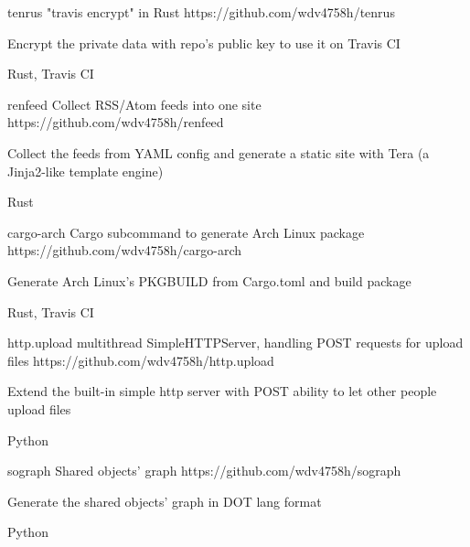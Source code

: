 \begin{cvopensources}
  \cvopensource
    {tenrus}   %
    {"travis encrypt" in Rust}  %
    {https://github.com/wdv4758h/tenrus}
    {
      \begin{cvitems}
        \item {Encrypt the private data with repo's public key to use it on Travis CI}
      \end{cvitems}
    }
    {Rust, Travis CI}

  \cvopensource
    {renfeed}   %
    {Collect RSS/Atom feeds into one site}  %
    {https://github.com/wdv4758h/renfeed}
    {
      \begin{cvitems}
      \item {Collect the feeds from YAML config and generate a static site with Tera (a Jinja2-like template engine)}
      \end{cvitems}
    }
    {Rust}

  \cvopensource
    {cargo-arch}   %
    {Cargo subcommand to generate Arch Linux package}  %
    {https://github.com/wdv4758h/cargo-arch}
    {
      \begin{cvitems}
        \item {Generate Arch Linux's PKGBUILD from Cargo.toml and build package}
      \end{cvitems}
    }
    {Rust, Travis CI}

  \cvopensource
    {http.upload}   %
    {multithread SimpleHTTPServer, handling POST requests for upload files}
    {https://github.com/wdv4758h/http.upload}
    {
      \begin{cvitems}
        \item {Extend the built-in simple http server with POST ability to let other people upload files}
      \end{cvitems}
    }
    {Python}

  \cvopensource
    {sograph}   %
    {Shared objects' graph}  %
    {https://github.com/wdv4758h/sograph}
    {
      \begin{cvitems}
        \item {Generate the shared objects' graph in DOT lang format}
      \end{cvitems}
    }
    {Python}


\end{cvopensources}
